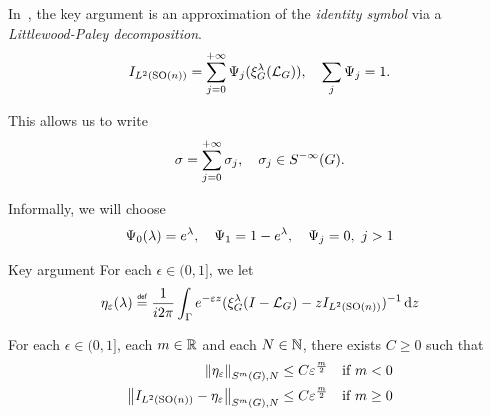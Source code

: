 \documentclass{beamer}
\begin{document}
\begin{frame}
    In~\cite{Fischer2015,FischerRuzhansky16},
    the key argument is an approximation of the \emph{identity symbol} via a \emph{Littlewood-Paley decomposition}.
    \begin{align*}
        \Id {\Lebesgue 2 {\SpecialOrthogonalGroup n}} = \sum_{j = 0}^{+ \infty} \Psi_j(\Rep \lambda (\Laplacian)),
        \quad \sum_j \Psi_j = 1.
    \end{align*}

    \pause

    This allows us to write
    \begin{align*}
        \sigma = \sum_{j = 0}^{+ \infty} \sigma_j,
        \quad
        \sigma_j \in \SmoothingSymbols.
    \end{align*}

    \pause

    Informally, we will choose
    \begin{align*}
        \Psi_0(\lambda) = \e^{\lambda}, \quad \Psi_1 = 1 - \e^{\lambda},
        \quad \Psi_j = 0, \ j > 1
    \end{align*}
\end{frame}

\begin{frame}{Key argument}
    For each $\epsilon \in (0, 1]$,
    we let
    \begin{align*}
        \eta_\epsilon(\lambda)
        \defeq
        \frac 1 {\i \turn}
        \int_\Gamma
        \e^{-\epsilon z}
        (\Rep \lambda \BesselPotentialSquared {} - z \Id {\Lebesgue 2 {\SpecialOrthogonalGroup n}})^{-1}
        \dd z
    \end{align*}

    \pause

    \begin{theorem}
        For each $\epsilon \in (0, 1]$, each $m \in \R$ and each $N \in \N$,
        there exists $C \geq 0$ such that
        \begin{align*}
                \SymbolSemiNorm m {} N {\eta_\epsilon}
                &\leq C \epsilon^\frac m 2
                & \text{if } m < 0\\
                \SymbolSemiNorm m {} N {\Id {\Lebesgue 2 {\SpecialOrthogonalGroup n}} - \eta_\epsilon}
                &\leq C \epsilon^\frac m 2
                & \text{if } m \geq 0
        \end{align*}
    \end{theorem}
\end{frame}
\end{document}
